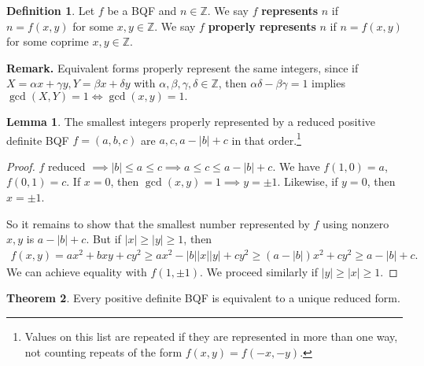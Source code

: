 \documentclass{article}
\theoremstyle{definition}
\newtheorem{theorem}{Theorem}[section]
\newtheorem{lemma}[theorem]{Lemma}
\newtheorem{defn}{Definition}[section]
\begin{document}
\begin{defn}
    Let $f$ be a BQF and $n \in \mathbb{Z}$. We say $f$ \textbf{represents} $n$ if $n=f(x,y)$ for some $x,y \in \mathbb{Z}$. We say $f$ \textbf{properly represents} $n$ if $n=f(x,y)$ for some coprime $x,y \in \mathbb{Z}$.
\end{defn}
\textbf{Remark.} Equivalent forms properly represent the same integers, since if $X=\alpha x  + \gamma y, Y = \beta x + \delta y$ with $\alpha,\beta,\gamma,\delta \in \mathbb{Z}$, then $\alpha \delta - \beta \gamma = 1$ implies $\gcd(X,Y)=1 \iff \gcd(x,y)=1.$
\begin{lemma}\label{4.7}
    The smallest integers properly represented by a reduced positive definite BQF $f=(a,b,c)$ are $a,c, a - |b| + c$ in that order.\footnote{Values on this list are repeated if they are represented in more than one way, not counting repeats of the form $f(x,y)=f(-x,-y)$.}
\end{lemma}
\begin{proof}
    $f$ reduced $\implies |b| \le a \le c \implies a \le c \le a - |b| + c$. We have $f(1,0)=a$, $f(0,1)=c$. If $x=0$, then $\gcd(x,y)=1 \implies y=\pm 1$. Likewise, if $y=0$, then $x = \pm 1$.

    So it remains to show that the smallest number represented by $f$ using nonzero $x,y$ is $a-|b|+c$. But if $|x|\ge |y|\ge 1$, then 
    \begin{align*}
        f(x,y)=ax^2+bxy+cy^2\ge ax^2 - |b||x||y| + cy^2 \ge (a-|b|)x^2 + cy^2 \ge a - |b| + c.
    \end{align*}
    We can achieve equality with $f(1,\pm 1)$. We proceed similarly if $|y|\ge |x|\ge 1$.
\end{proof}
\begin{theorem}\label{4.8}
    Every positive definite BQF is equivalent to a unique reduced form.
\end{theorem}
\end{document}
